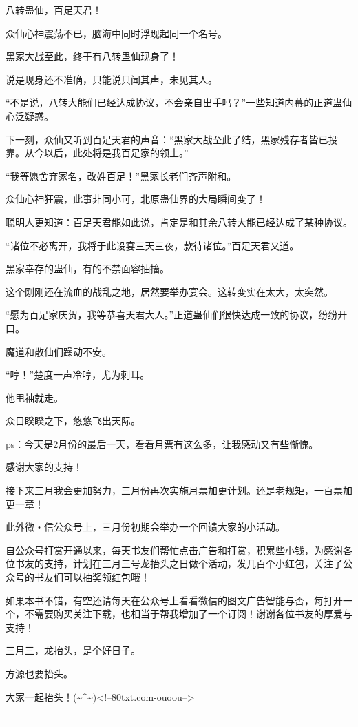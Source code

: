 \begin{this_body}
八转蛊仙，百足天君！

众仙心神震荡不已，脑海中同时浮现起同一个名号。

黑家大战至此，终于有八转蛊仙现身了！

说是现身还不准确，只能说只闻其声，未见其人。

“不是说，八转大能们已经达成协议，不会亲自出手吗？”一些知道内幕的正道蛊仙心泛疑惑。

下一刻，众仙又听到百足天君的声音：“黑家大战至此了结，黑家残存者皆已投靠。从今以后，此处将是我百足家的领土。”

“我等愿舍弃家名，改姓百足！”黑家长老们齐声附和。

众仙心神狂震，此事非同小可，北原蛊仙界的大局瞬间变了！

聪明人更知道：百足天君能如此说，肯定是和其余八转大能已经达成了某种协议。

“诸位不必离开，我将于此设宴三天三夜，款待诸位。”百足天君又道。

黑家幸存的蛊仙，有的不禁面容抽搐。

这个刚刚还在流血的战乱之地，居然要举办宴会。这转变实在太大，太突然。

“愿为百足家庆贺，我等恭喜天君大人。”正道蛊仙们很快达成一致的协议，纷纷开口。

魔道和散仙们躁动不安。

“哼！”楚度一声冷哼，尤为刺耳。

他甩袖就走。

众目睽睽之下，悠悠飞出天际。

ps：今天是2月份的最后一天，看看月票有这么多，让我感动又有些惭愧。

感谢大家的支持！

接下来三月我会更加努力，三月份再次实施月票加更计划。还是老规矩，一百票加更一章！

此外微・信公众号上，三月份初期会举办一个回馈大家的小活动。

自公众号打赏开通以来，每天书友们帮忙点击广告和打赏，积累些小钱，为感谢各位书友的支持，计划在三月三号龙抬头之日做个活动，发几百个小红包，关注了公众号的书友们可以抽奖领红包哦！

如果本书不错，有空还请每天在公众号上看看微信的图文广告智能与否，每打开一个，不需要购买关注下载，也相当于帮我增加了一个订阅！谢谢各位书友的厚爱与支持！

三月三，龙抬头，是个好日子。

方源也要抬头。

大家一起抬头！(\~{}\^{}\~{})<!--80txt.com-ouoou-->

------------

\end{this_body}

